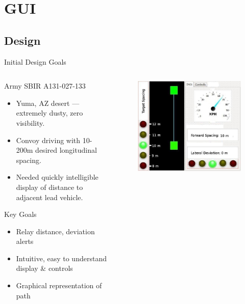 \documentclass{beamer}
\begin{document}

\section{GUI}

  \subsection{Design}

    \begin{frame}{Initial Design Goals}
      \begin{columns}
        \begin{column}{0.5\linewidth}
          Army SBIR A131-027-133
          \begin{itemize} \footnotesize
            \item Yuma, AZ desert --- extremely dusty, zero visibility.
            \item Convoy driving with 10-200m desired longitudinal spacing.
            \item Needed quickly intelligible display of distance to adjacent lead vehicle.
          \end{itemize}
          Key Goals
          \begin{itemize} \footnotesize
            \item Relay distance, deviation alerts
            \item Intuitive, easy to understand display \& controls
            \item Graphical representation of path
          \end{itemize}
        \end{column}
        \begin{column}{0.5\linewidth}
          \begin{figure}
            \includegraphics[width=\textwidth]{../graphics/initial_concept.png}

\end{figure}
\end{column}
\end{columns}
\end{frame}
\end{document}
